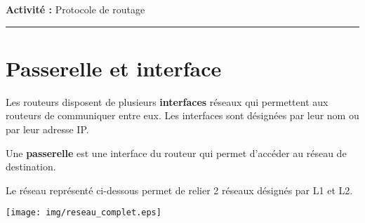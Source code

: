 \documentclass[11pt,a4paper]{article}
\begin{document}

\begin{huge}
\textbf{Activité : } Protocole de routage
\end{huge}\medskip
\hrule


\section*{Passerelle et interface}

Les routeurs disposent de plusieurs \textbf{interfaces} réseaux qui permettent aux routeurs de communiquer entre eux. Les interfaces sont désignées par leur nom ou par leur adresse IP. \medskip

Une \textbf{passerelle} est une interface du routeur qui permet d'accéder au réseau de destination.\medskip

Le réseau représenté ci-dessous permet de relier 2 réseaux désignés par L1 et L2. 

\begin{center}
\texttt{[image: img/reseau\_complet.eps]}
\end{center}
\end{document}
